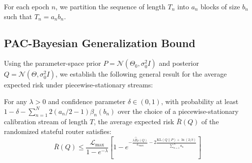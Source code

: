 For each epoch $n$, we partition the sequence of length $T_n$ into $a_n$ blocks of size $b_n$ such that $T_n = a_n b_n$.

\subsection{PAC-Bayesian Generalization Bound}
Using the parameter-space prior $P = \mathcal{N}(\Theta_0, \sigma_0^2 I)$ and posterior $Q = \mathcal{N}(\Theta, \sigma_0^2 I)$, we establish the following general result for the average expected risk under piecewise-stationary streams:

\begin{theorem}
\label{thm:piecewise_pac_bayes}
For any $\lambda > 0$ and confidence parameter $\delta \in (0, 1)$, with probability at least $1 - \delta - \sum_{n=1}^N 2(a_n/2 - 1)\beta_n(b_n)$ over the choice of a piecewise-stationary calibration stream of length $T$, the average expected risk $\bar{R}(Q)$ of the randomized stateful router satisfies:
\begin{equation}
\label{eq:piecewise_bound}
    \bar{R}(Q) \le \frac{\mathcal{L}_{\max}}{1 - e^{-\lambda}} \left[ 1 - e^{-\frac{\lambda \bar{\hat{R}}_T(Q)}{\mathcal{L}_{\max}} - 2 \frac{\text{KL}(Q \| P) + \ln(2/\delta)}{\sum_{n=1}^N a_n}} \right]
\end{equation}
\end{theorem}

